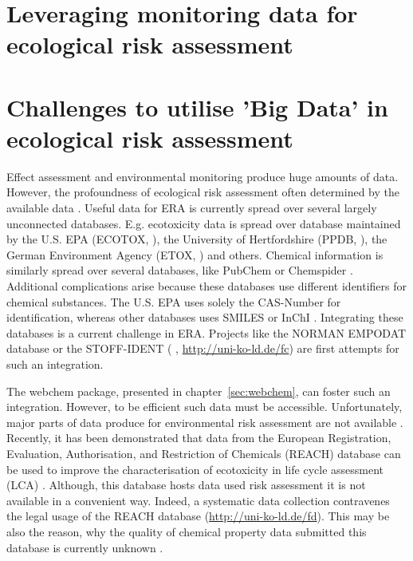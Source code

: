 \section{Leveraging monitoring data for ecological risk assessment}







\section{Challenges to utilise 'Big Data' in ecological risk assessment}

Effect assessment and environmental monitoring produce huge amounts of data. 
However, the profoundness of ecological risk assessment often determined by the available data \citep{van_den_brink_new_2016}.
Useful data for ERA is currently spread over several largely unconnected databases. 
E.g. ecotoxicity data is spread over database maintained by the U.S. EPA (ECOTOX, \citet{u.s._epa_ecotox_2016}), the University of Hertfordshire (PPDB, \citet{lewis_international_2016}), the German Environment Agency (ETOX, \citet{umweltbundesamt_etox:_2016}) and others. 
Chemical information is similarly spread over several databases, like PubChem \citep{kim_pubchem_2016} or Chemspider \citep{pence_chemspider:_2010}.
Additional complications arise because these databases use different identifiers for chemical substances. 
The U.S. EPA \citep{u.s._epa_ecotox_2016} uses solely the CAS-Number for identification, whereas other databases uses SMILES \citep{weininger_smiles._1990} or InChI \citep{heller_inchi_2015}. 
Integrating these databases is a current challenge in ERA.
Projects like the NORMAN EMPODAT database \citep{brack_norman_2012} or the STOFF-IDENT (\citeauthor{huckele_risk_2013} \cite*{huckele_risk_2013}, \url{http://uni-ko-ld.de/fc}) are first attempts for such an integration.

The webchem package, presented in chapter~\ref{sec:webchem}, can foster such an integration. 
However, to be efficient such data must be accessible. 
Unfortunately, major parts of data produce for environmental risk assessment are not available \citep{schafer_letter_2013}. 
Recently, it has been demonstrated that data from the European Registration, Evaluation, Authorisation, and Restriction of Chemicals (REACH) database can be used to improve the characterisation of ecotoxicity in life cycle assessment (LCA) \citep{muller_exploring_2016}.
Although, this database hosts data used risk assessment it is not available in a convenient way.
Indeed, a systematic data collection contravenes the legal usage of the REACH database (\url{http://uni-ko-ld.de/fd}).
This may be also the reason, why the quality of chemical property data submitted this database is currently unknown \citep{stieger_assessing_2014, muller_exploring_2016}. 

